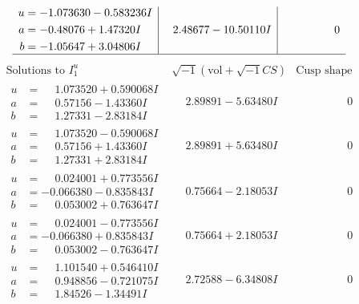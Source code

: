 \documentclass[1p]{elsarticle_modified}
\theoremstyle{definition}
\newcommand{\I}{\sqrt{-1}}
\begin{document}
$$\begin{array}{c|c|c}
\begin{aligned}
u &= -1.073630 - 0.583236 I \\
a &= -0.48076 + 1.47320 I \\
b &= -1.05647 + 3.04806 I\end{aligned}
 & \phantom{-}2.48677 - 10.50110 I & \phantom{-0.000000 } 0\\
 \hline 
 \end{array}$$\newpage$$\begin{array}{c|c|c}  
\text{Solutions to }I^u_{1}& \I (\text{vol} + \sqrt{-1}CS) & \text{Cusp shape}\\
 \hline 
\begin{aligned}
u &= \phantom{-}1.073520 + 0.590068 I \\
a &= \phantom{-}0.57156 - 1.43360 I \\
b &= \phantom{-}1.27331 - 2.83184 I\end{aligned}
 & \phantom{-}2.89891 - 5.63480 I & \phantom{-0.000000 } 0 \\ \hline\begin{aligned}
u &= \phantom{-}1.073520 - 0.590068 I \\
a &= \phantom{-}0.57156 + 1.43360 I \\
b &= \phantom{-}1.27331 + 2.83184 I\end{aligned}
 & \phantom{-}2.89891 + 5.63480 I & \phantom{-0.000000 } 0 \\ \hline\begin{aligned}
u &= \phantom{-}0.024001 + 0.773556 I \\
a &= -0.066380 - 0.835843 I \\
b &= \phantom{-}0.053002 + 0.763647 I\end{aligned}
 & \phantom{-}0.75664 - 2.18053 I & \phantom{-0.000000 } 0 \\ \hline\begin{aligned}
u &= \phantom{-}0.024001 - 0.773556 I \\
a &= -0.066380 + 0.835843 I \\
b &= \phantom{-}0.053002 - 0.763647 I\end{aligned}
 & \phantom{-}0.75664 + 2.18053 I & \phantom{-0.000000 } 0 \\ \hline\begin{aligned}
u &= \phantom{-}1.101540 + 0.546410 I \\
a &= \phantom{-}0.948856 - 0.721075 I \\
b &= \phantom{-}1.84526 - 1.34491 I\end{aligned}
 & \phantom{-}2.72588 - 6.34808 I & \phantom{-0.000000 } 0 \\ \hline\begin{aligned}

\end{aligned}
\end{array}$$
\end{document}
